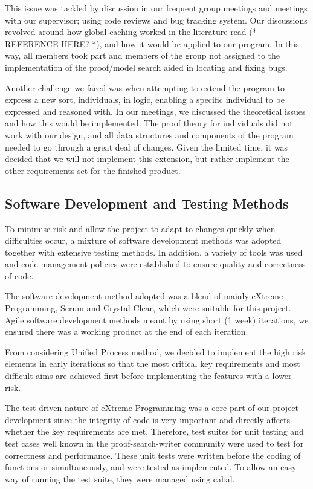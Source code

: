 This issue was tackled by discussion in our frequent group meetings and meetings with our supervisor; using code reviews and bug tracking system. Our discussions revolved around how global caching worked in the literature read (* REFERENCE HERE? *), and how it would be applied to our program. In this way, all members took part and members of the group not assigned to the implementation of the proof/model search aided in locating and fixing bugs.

Another challenge we faced was when attempting to extend the program to express a new sort, individuals, in logic, enabling a specific individual to be expressed and reasoned with. In our meetings, we discussed the theoretical issues and how this would be implemented. The proof theory for individuals did not work with our design, and all data structures and components of the program needed to go through a great deal of changes. Given the limited time, it was decided that we will not implement this extension, but rather implement the other requirements set for the finished product.

\subsection{Software Development and Testing Methods}

To minimise risk and allow the project to adapt to changes quickly when difficulties occur, a mixture of software development methods was adopted together with extensive testing methods. In addition, a variety of tools was used and code management policies were established to ensure quality and correctness of code.


The software development method adopted was a blend of mainly eXtreme Programming, Scrum and Crystal Clear, which were suitable for this project. Agile software development methods meant by using short (1 week) iterations, we ensured there was a working product at the end of each iteration.

From considering Unified Process method, we decided to implement the high risk elements in early iterations so that the most critical key requirements and most difficult aims are achieved first before implementing the features with a lower risk.

The test-driven nature of eXtreme Programming was a core part of our project development since the integrity of code is very important and directly affects whether the key requirements are met. Therefore, test suites for unit testing and test cases well known in the proof-search-writer community were used to test for correctness and performance. These unit tests were written before the coding of functions or simultaneously, and were tested as implemented. To allow an easy way of running the test suite, they were managed using cabal.

